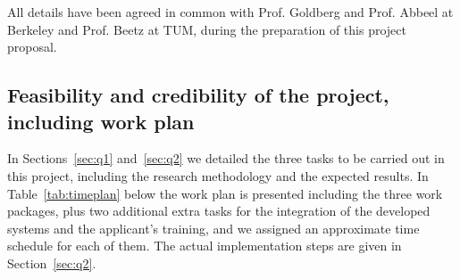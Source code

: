 All details  have been agreed in  common with Prof. Goldberg and Prof. Abbeel  
at Berkeley and Prof. Beetz at TUM, during the preparation of this project proposal.

\subsection{Feasibility and credibility of the project, including work plan} 
In Sections~\ref{sec:q1} and~\ref{sec:q2} we detailed the three tasks to be carried 
out in this project, including the research methodology and the expected results. 
In Table~\ref{tab:timeplan} below the work plan is presented including the three 
work packages, plus two additional extra tasks for the integration of the developed systems
and the applicant's training, and we assigned an approximate time schedule for each of them.
The actual implementation steps are given in Section~\ref{sec:q2}.

